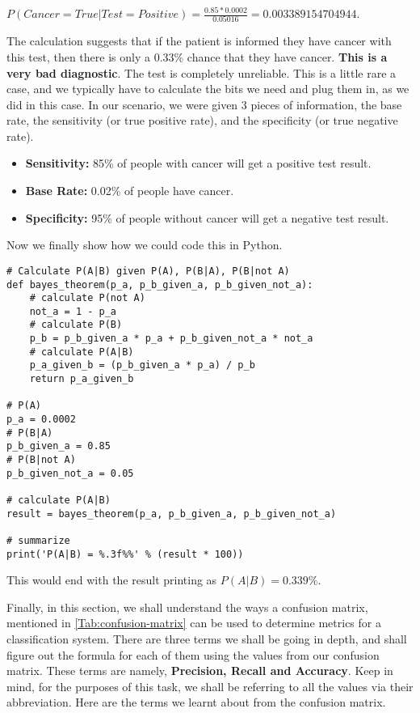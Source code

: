 $P\left(Cancer=True | Test=Positive\right) = \frac{0.85 * 0.0002}{0.05016} = 0.003389154704944$.

The calculation suggests that if the patient is informed they have cancer with this test, then there is only a 0.33\% chance that they have cancer. \textbf{This is a very bad diagnostic}. The test is completely unreliable. This is a little rare a case, and we typically have to calculate the bits we need and plug them in, as we did in this case. In our scenario, we were given 3 pieces of information, the base rate, the  sensitivity (or true positive rate), and the specificity (or true negative rate).

\begin{itemize}
    \item \textbf{Sensitivity:} 85\% of people with cancer will get a positive test result.
    \item \textbf{Base Rate:} 0.02\% of people have cancer.
    \item \textbf{Specificity:} 95\% of people without cancer will get a negative test result.
\end{itemize}

Now we finally show how we could code this in Python.

\begin{code}
\begin{verbatim}
# Calculate P(A|B) given P(A), P(B|A), P(B|not A)
def bayes_theorem(p_a, p_b_given_a, p_b_given_not_a):
    # calculate P(not A)
    not_a = 1 - p_a
    # calculate P(B)
	p_b = p_b_given_a * p_a + p_b_given_not_a * not_a
	# calculate P(A|B)
	p_a_given_b = (p_b_given_a * p_a) / p_b
	return p_a_given_b

# P(A)
p_a = 0.0002
# P(B|A)
p_b_given_a = 0.85
# P(B|not A)
p_b_given_not_a = 0.05

# calculate P(A|B)
result = bayes_theorem(p_a, p_b_given_a, p_b_given_not_a)

# summarize
print('P(A|B) = %.3f%%' % (result * 100))
\end{verbatim}
\end{code}

This would end with the result printing as $P\left(A|B\right) = 0.339\%$.

Finally, in this section, we shall understand the ways a confusion matrix, mentioned in \ref{Tab:confusion-matrix} can be used to determine metrics for a classification system. There are three terms we shall be going in depth, and shall figure out the formula for each of them using the values from our confusion matrix. These terms are namely, \textbf{Precision, Recall and Accuracy}. Keep in mind, for the purposes of this task, we shall be referring to all the values via their abbreviation. Here are the terms we learnt about from the confusion matrix. 

